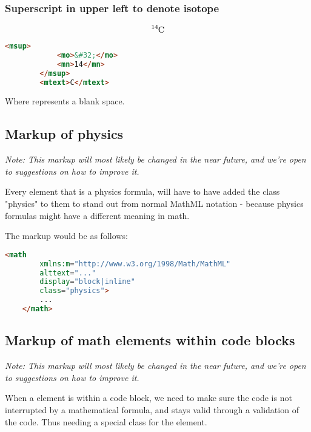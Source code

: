 \documentclass[english,a4paper,11pt]{article}
\begin{document}
\subsubsection{Superscript in upper left to denote isotope}\label{chemistry-isotope}

\begin{examples}
	\begin{equation}
		\ce{^{14}C}
	\end{equation}
	\begin{lstlisting}[language=HTML]
		<msup>
			<mo>&#32;</mo>
			<mn>14</mn>
		</msup>
		<mtext>C</mtext>
	\end{lstlisting}
	Where  represents a blank space.
\end{examples}

\subsection{Markup of physics}\label{physics}

\textit{Note: This markup will most likely be changed in the near future, and we're open to suggestions on how to improve it.}

Every  element that is a physics formula, will have to have added the class "physics" to them to stand out from normal MathML notation - because physics formulas might have a different meaning in math.

\begin{examples}
The markup would be as follows:
\begin{lstlisting}[language=HTML]
	<math 
	    xmlns:m="http://www.w3.org/1998/Math/MathML"
	    alttext="..."
	    display="block|inline"
		class="physics">
		...
	</math>
\end{lstlisting}
\end{examples}

\subsection{Markup of math elements within code blocks}

\textit{Note: This markup will most likely be changed in the near future, and we're open to suggestions on how to improve it.}

When a  element is within a code block, we need to make sure the code is not interrupted by a mathematical formula, and stays valid through a validation of the code. Thus needing a special class for the  element.
\end{document}
